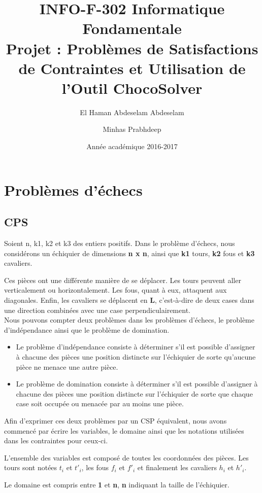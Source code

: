 \documentclass{article}
\title{INFO-F-302 Informatique Fondamentale\\ Projet : Problèmes de Satisfactions de Contraintes et Utilisation de l’Outil ChocoSolver}
\author{El Haman Abdeselam Abdeselam \and Minhas Prabhdeep}
\date{Année académique 2016-2017}
\begin{document}
\maketitle

\section{Problèmes d'échecs}

\subsection{CPS}
Soient n, k1, k2 et k3 des entiers positifs.
Dans le problème d'échecs, nous considérons un échiquier de dimensions \textbf{n x n}, ainsi que \textbf{k1} tours, \textbf{k2} fous et \textbf{k3} cavaliers. 

Ces pièces ont une différente manière de se déplacer. Les tours peuvent aller verticalement ou horizontalement. Les fous, quant à eux, attaquent aux diagonales. Enfin, les cavaliers se déplacent en \textbf{L}, c’est-à-dire de deux cases dans une direction combinées avec une case perpendiculairement. \\

Nous pouvons compter deux problèmes dans les problèmes d'échecs, le problème d'indépendance ainsi que le problème de domination.
\begin{itemize}
\item Le problème d'indépendance consiste à déterminer s'il est possible d'assigner à chacune des pièces une position distincte sur l'échiquier de sorte qu'aucune pièce ne menace une autre pièce.
\item Le problème de domination consiste à déterminer s'il est possible d'assigner à chacune des pièces une position distincte sur l'échiquier de sorte que chaque case soit occupée ou menacée par au moins une pièce. \\
\end{itemize}

Afin d'exprimer ces deux problèmes par un CSP équivalent, nous avons commencé par écrire les variables, le domaine ainsi que les notations utilisées dans les contraintes pour ceux-ci.

L'ensemble des variables est composé de toutes les coordonnées des pièces. Les tours sont notées $t_{i}$ et $t'_{i}$, les fous $f_{i}$ et $f'_{i}$ et finalement les cavaliers $h_{i}$ et $h'_{i}$.

Le domaine est compris entre \textbf{1} et \textbf{n}, \textbf{n} indiquant la taille de l'échiquier.
\end{document}
